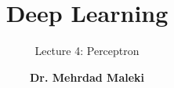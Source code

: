 \documentclass[12pt,aspectratio=169]{beamer}
\title{Deep Learning}
\subtitle{Lecture 4: Perceptron}
\author[]{\textbf{Dr. Mehrdad Maleki}}
\date{}
\def\scalefact{0.85}
\newcommand{\znode}[5][black]{\path (#3,#4) node(#2) [circle,draw,color=#1] {#5};}
\newcommand{\zunedge}[6][black]{%
\begin{scope}
	\path (#2,#3) node(this) [inner sep=0pt,triangle,draw,color=#1] {#4};
	\draw[->,color=#1] (#5) -- (this.west);
	\draw[->,color=#1] (this.east) -- (#6);
\end{scope}}
\newcommand{\zbiedge}[7][black]{%
\begin{scope}
	\path (#2,#3) node(this) [inner sep=0pt,triangle,draw,color=#1] {#4};
	\draw[->,color=#1] (#5) -- (this);
	\draw[->,color=#1] (#6) -- (this);
	\draw[->,color=#1] (this.east) -- (#7);
\end{scope}}
\newcommand{\zedge}[5][black]{\path (#3,#4) node(#2) [inner sep=0pt,triangle,draw,color=#1] {#5};}
\begin{document}
 
\frame{\titlepage}

\newcommand{\SYSTEM}[2]{\raisebox{-1ex}{\shortstack{#1\\[-0.25ex]\tiny #2}}}
\newcommand{\YES}{\textcolor{dkgreen}{$\ballotcheck$}}
\newcommand{\NOPE}{\textcolor{dkred}{$\ballotx$}}
\newcommand{\MAYBE}{\textcolor{dkblue}{\textbf{?}}}



\end{document}
